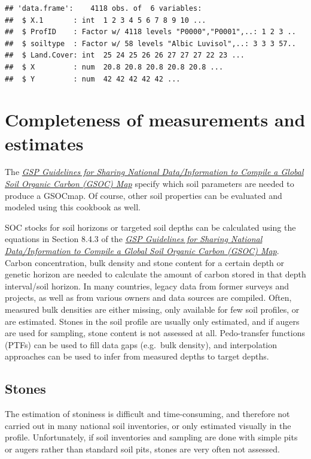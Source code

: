 \documentclass[10pt,b5paper,]{book}
\theoremstyle{definition}
\theoremstyle{definition}
\theoremstyle{definition}
\theoremstyle{remark}
\begin{document}
\begin{verbatim}
## 'data.frame':    4118 obs. of  6 variables:
##  $ X.1       : int  1 2 3 4 5 6 7 8 9 10 ...
##  $ ProfID    : Factor w/ 4118 levels "P0000","P0001",..: 1 2 3 ..
##  $ soiltype  : Factor w/ 58 levels "Albic Luvisol",..: 3 3 3 57..
##  $ Land.Cover: int  25 24 25 26 26 27 27 27 22 23 ...
##  $ X         : num  20.8 20.8 20.8 20.8 20.8 ...
##  $ Y         : num  42 42 42 42 42 ...
\end{verbatim}

\hypertarget{completeness-of-measurements-and-estimates}{%
\section{Completeness of measurements and
estimates}\label{completeness-of-measurements-and-estimates}}

The \href{http://www.fao.org/3/a-bp164e.pdf}{\emph{GSP Guidelines for
Sharing National Data/Information to Compile a Global Soil Organic
Carbon (GSOC) Map}} \citep{gsp_guidelines_2017} specify which soil
parameters are needed to produce a GSOCmap. Of course, other soil
properties can be evaluated and modeled using this cookbook as well.

SOC stocks for soil horizons or targeted soil depths can be calculated
using the equations in Section 8.4.3 of the
\href{http://www.fao.org/3/a-bp164e.pdf}{\emph{GSP Guidelines for
Sharing National Data/Information to Compile a Global Soil Organic
Carbon (GSOC) Map}}. Carbon concentration, bulk density and stone
content for a certain depth or genetic horizon are needed to calculate
the amount of carbon stored in that depth interval/soil horizon. In many
countries, legacy data from former surveys and projects, as well as from
various owners and data sources are compiled. Often, measured bulk
densities are either missing, only available for few soil profiles, or
are estimated. Stones in the soil profile are usually only estimated,
and if augers are used for sampling, stone content is not assessed at
all. Pedo-transfer functions (PTFs) can be used to fill data gaps
(e.g.~bulk density), and interpolation approaches can be used to infer
from measured depths to target depths.

\hypertarget{stones}{%
\subsection{Stones}\label{stones}}

The estimation of stoniness is difficult and time-consuming, and
therefore not carried out in many national soil inventories, or only
estimated visually in the profile. Unfortunately, if soil inventories
and sampling are done with simple pits or augers rather than standard
soil pits, stones are very often not assessed.
\end{document}

